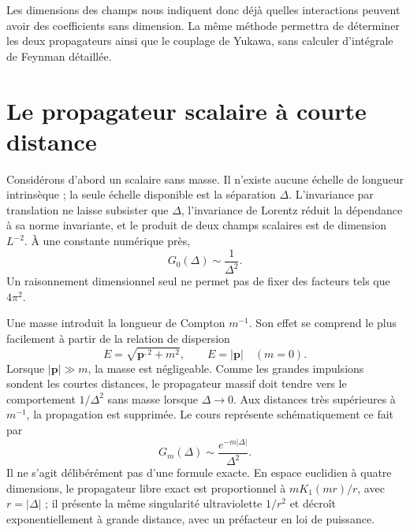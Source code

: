 Les dimensions des champs nous indiquent donc déjà quelles interactions peuvent avoir des coefficients sans dimension. La même méthode permettra de déterminer les deux propagateurs ainsi que le couplage de Yukawa, sans calculer d’intégrale de Feynman détaillée.

\section{Le propagateur scalaire à courte distance}

Considérons d’abord un scalaire sans masse. Il n’existe aucune échelle de longueur intrinsèque ; la seule échelle disponible est la séparation \(\Delta\). L’invariance par translation ne laisse subsister que \(\Delta\), l’invariance de Lorentz réduit la dépendance à sa norme invariante, et le produit de deux champs scalaires est de dimension \(L^{-2}\). À une constante numérique près,
\begin{equation}
G_0(\Delta)\sim\frac{1}{\Delta^2}.
\end{equation}
Un raisonnement dimensionnel seul ne permet pas de fixer des facteurs tels que \(4\pi^2\).

Une masse introduit la longueur de Compton \(m^{-1}\). Son effet se comprend le plus facilement à partir de la relation de dispersion
\begin{equation}
E=\sqrt{\bm p^{,2}+m^2},
\qquad
E=|\bm p|\quad(m=0).
\end{equation}
Lorsque \(|\bm p|\gg m\), la masse est négligeable. Comme les grandes impulsions sondent les courtes distances, le propagateur massif doit tendre vers le comportement \(1/\Delta^2\) sans masse lorsque \(\Delta\to0\). Aux distances très supérieures à \(m^{-1}\), la propagation est supprimée. Le cours représente schématiquement ce fait par
\begin{equation}
G_m(\Delta)\sim \frac{e^{-m|\Delta|}}{\Delta^2}.
\end{equation}
Il ne s’agit délibérément pas d’une formule exacte. En espace euclidien à quatre dimensions, le propagateur libre exact est proportionnel à \(mK_1(mr)/r\), avec \(r=|\Delta|\) ; il présente la même singularité ultraviolette \(1/r^2\) et décroît exponentiellement à grande distance, avec un préfacteur en loi de puissance.

